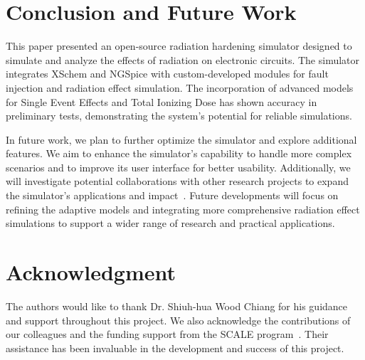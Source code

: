 \documentclass[conference]{IEEEtran}
\begin{document}
    \section{Conclusion and Future Work}\label{sec:conclusion-and-future-work}
    This paper presented an open-source radiation hardening simulator designed to simulate and analyze the effects of radiation on electronic circuits.
    The simulator integrates XSchem and NGSpice with custom-developed modules for fault injection and radiation effect simulation.
    The incorporation of advanced models for Single Event Effects and Total Ionizing Dose has shown accuracy in preliminary tests, demonstrating the system's potential for reliable simulations.

    In future work, we plan to further optimize the simulator and explore additional features.
    We aim to enhance the simulator's capability to handle more complex scenarios and to improve its user interface for better usability.
    Additionally, we will investigate potential collaborations with other research projects to expand the simulator's applications and impact~\cite{Pepper1990}.
    Future developments will focus on refining the adaptive models and integrating more comprehensive radiation effect simulations to support a wider range of research and practical applications.

    \section*{Acknowledgment}
    The authors would like to thank Dr. Shiuh-hua Wood Chiang for his guidance and support throughout this project.
    We also acknowledge the contributions of our colleagues and the funding support from the SCALE program~\cite{SCALE}.
    Their assistance has been invaluable in the development and success of this project.

    
    
\end{document}
